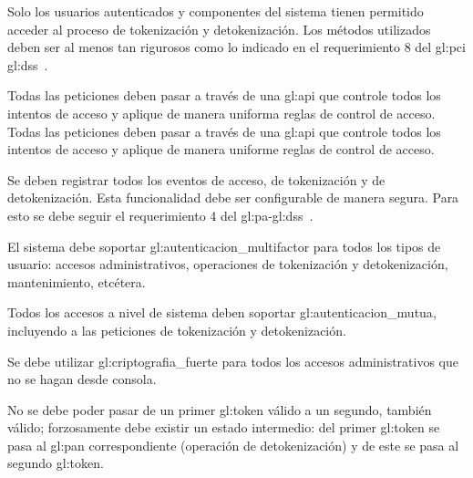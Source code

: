 {
  Solo los usuarios autenticados y componentes del sistema tienen permitido
  acceder al proceso de tokenización y detokenización. Los métodos utilizados
  deben ser al menos tan rigurosos como lo indicado en el requerimiento 8 del
  \gls{gl:pci} \gls{gl:dss}~\cite{pci_dss}.
}

  {
    Todas las peticiones deben pasar a través de una \gls{gl:api} que controle
    todos los intentos de acceso y aplique de manera uniforma reglas de
    control de acceso.
  }
{
  Todas las peticiones deben pasar a través de una \gls{gl:api} que controle
  todos los intentos de acceso y aplique de manera uniforme reglas de
  control de acceso.
}

{
  Se deben registrar todos los eventos de acceso, de tokenización y
  de detokenización. Esta funcionalidad debe ser configurable de manera
  segura. Para esto se debe seguir el requerimiento 4 del
  \gls{gl:pa}-\gls{gl:dss}~\cite{dss_pa}.
}

{
  El sistema debe soportar \gls{gl:autenticacion_multifactor} para todos
  los tipos de usuario: accesos administrativos, operaciones de tokenización
  y detokenización, mantenimiento, etcétera.
}

{
  Todos los accesos a nivel de sistema deben soportar
  \gls{gl:autenticacion_mutua}, incluyendo a las peticiones de tokenización
  y detokenización.
}

{
  Se debe utilizar \gls{gl:criptografia_fuerte} para todos los accesos
  administrativos que no se hagan desde consola.
}

{
  No se debe poder pasar de un primer \gls{gl:token} válido a un segundo,
  también válido; forzosamente debe existir un estado intermedio: del primer
  \gls{gl:token} se pasa al \gls{gl:pan} correspondiente (operación de
  detokenización) y de este se pasa al segundo \gls{gl:token}.
}

